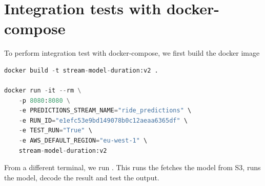 \documentclass[letterpaper,12pt,notitlepage,twoside]{report}
\begin{document}
\section{Integration tests with docker-compose}
To perform integration test with docker-compose, we first build the docker image
\begin{lstlisting}[language=python, numbers=none]
docker build -t stream-model-duration:v2 .

docker run -it --rm \
    -p 8080:8080 \
    -e PREDICTIONS_STREAM_NAME="ride_predictions" \
    -e RUN_ID="e1efc53e9bd149078b0c12aeaa6365df" \
    -e TEST_RUN="True" \
    -e AWS_DEFAULT_REGION="eu-west-1" \
    stream-model-duration:v2
\end{lstlisting}
From a different terminal, we run . This runs the fetches the model from S3, runs the model, decode the result and test the output.
\end{document}
